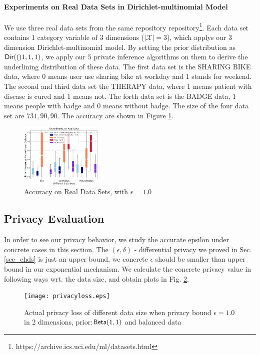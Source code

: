 \documentclass{article}
\begin{document}
\paragraph{Experiments on Real Data Sets in Dirichlet-multinomial Model}
We use three real data sets from the same repository repository\footnote{https://archive.ics.uci.edu/ml/datasets.html}. Each data set contains 1 category variable of 3 dimensions ($|\mathcal{X}| = 3$), which applys our 3 dimension Dirichlet-multinomial model. By setting the prior distribution as $\mathsf{Dir}(()1,1,1)$, we apply our 5 private inference algorithms on them to derive the underlining distribution of these data. The first data set is the SHARING BIKE data, where $0$ means user use sharing bike at workday and $1$ stands for weekend. The second and third data set the THERAPY data, where $1$ means patient with disease is cured and $1$ means not. The forth data set is the BADGE data, $1$ means people with badge and $0$ means without badge. The size of the four data set are $731, 90, 90$. The accuracy are shown in Figure \ref{fig_real_3d}.
\begin{figure}
\centering
\includegraphics[width=0.35\textwidth]{realdata_3d.eps}
\caption{Accuracy on Real Data Sets, with $\epsilon = 1.0$}
\label{fig_real_3d}
\end{figure}


\subsection{Privacy Evaluation}
\label{subsec_experiment_privacy}
In order to see our privacy behavior, we study the accurate epsilon under concrete cases in this section. The $(\epsilon, \delta)$ - differential privacy we proved in Sec. \ref{sec_ehds} is just an upper bound, we concrete $\epsilon$ should be smaller than upper bound in our exponential mechanism. We calculate the concrete privacy value in following ways wrt. the data size, and obtain plots in Fig. \ref{fig_privacy}.

\begin{figure}
\begin{center}
\centering
    \texttt{[image: privacyloss.eps]}
\caption{Actual privacy loss of different data size when privacy bound $\epsilon = 1.0$ in 2 dimensions, prior:$\mathsf{Beta}(1,1)$ and balanced data}
\label{fig_privacy}
\end{center}
\end{figure}
\end{document}
